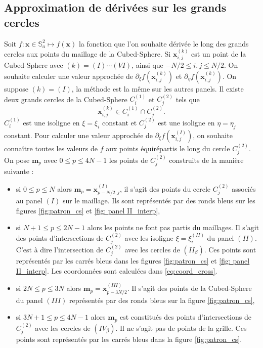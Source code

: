 \subsection{Approximation de dérivées sur les grands cercles}

Soit $f : \mathbf{x}\in \mathbb{S}_a^2 \mapsto f(\mathbf{x})$ la fonction que l'on souhaite dérivée le long des grands cercles aux points du maillage de la Cubed-Sphere.
Si $\mathbf{x}_{i,j}^{(k)}$ est un point de la Cubed-Sphere avec $(k) = (I) \cdots (VI)$, ainsi que $-N/2 \leq i,j \leq N/2$. On souhaite calculer une valeur approchée de 
$
\partial_{\xi} f (\mathbf{x}_{i,j}^{(k)})$ et $\partial_{\eta} f (\mathbf{x}_{i,j}^{(k)})$.
On suppose $(k) = (I)$, la méthode est la même sur les autres panels. Il existe deux grands cercles de la Cubed-Sphere $C_i^{(1)}$ et $C_j^{(2)}$ tels que 
\begin{equation}
\mathbf{x}_{i,j}^{(k)} \in C_i^{(1)} \cap C^{(2)}_j.
\end{equation}
$C^{(1)}_i$ est une isoligne en $\xi = \xi_i$ constant et $C^{(2)}_j$ est une isoligne en $\eta = \eta_j$ constant.
Pour calculer une valeur approchée de $\partial_{\xi} f (\mathbf{x}_{i,j}^{(I)})$, on souhaite connaître toutes les valeurs de $f$ aux points équirépartis le long du cercle $C^{(2)}_j$. On pose $\mathbf{m}_p$ avec $0 \leq p \leq 4N-1$ les points de $C^{(2)}_j$ construits de la manière suivante :
\begin{itemize}
\item si $0 \leq p \leq N$ alors $\mathbf{m}_p = \mathbf{x}^{(I)}_{p-N/2,j}$, il s'agit des points du cercle $C^{(2)}_j$ associés au panel $(I)$ sur le maillage. Ils sont représentés par des ronds bleus sur les figures \ref{fig:patron_cs} et \ref{fig: panel II_interp},
\item si $N+1 \leq p \leq 2N-1$ alors les points ne font pas partis du maillages. Il s'agit des points d'intersections de $C^{(2)}_j$ avec les isoligne $\xi = \xi_i^{(II)}$ du panel $(II)$. C'est à dire l'intersection de $C^{(2)}_j$ avec les cercles de $(II_{\beta})$. Ces points sont représentés par les carrés bleus dans les figures \ref{fig:patron_cs} et \ref{fig: panel II_interp}. Les coordonnées sont calculées dans \eqref{eq:coord_cross}.
\item si $2N \leq p \leq 3N$ alors $\mathbf{m}_p = \mathbf{x}^{(III)}_{p-3N/2}$. Il s'agit des points de la Cubed-Sphere du panel $(III)$ représentés par des ronds bleus sur la figure \ref{fig:patron_cs},
\item si $3N+1 \leq p \leq 4N-1$ alors $\mathbf{m}_p$ est constitués des points d'intersections de $C^{(2)}_j$ avec les cercles de $(IV_{\beta})$. Il ne s'agit pas de points de la grille. Ces points sont représentés par les carrés bleus dans la figure \ref{fig:patron_cs}.
\end{itemize}

